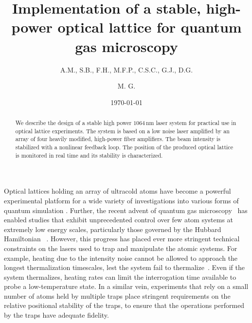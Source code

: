 \documentclass[twocolumn,aps,pra,showpacs,preprintnumbers,bibnotes]{revtex4-1}
\begin{document}
\title{Implementation of a stable, high-power optical lattice for quantum gas microscopy}


\author{A.M., S.B., F.H., M.F.P., C.S.C., G.J., D.G.}
\author{M. G.}

\date{\today}
\begin{abstract}
 We describe the design of a stable high power $1064\,$nm laser system for practical use in optical lattice experiments. The system is based on a low noise laser amplified by an array of four heavily modified, high-power fiber amplifiers. The beam intensity is stabilized with a nonlinear feedback loop. The position of the produced optical lattice is monitored in real time and its stability is characterized.
\end{abstract}
\maketitle

Optical lattices holding an array of ultracold atoms have become a powerful experimental platform for a wide variety of investigations into various forms of quantum simulation \cite{Friedenauer2008, Kim2010, Struck2011, Simon2011, Yan2013, Drewes2016, Murmann2015}.%
Further, the recent advent of quantum gas microscopy~\cite{Bakr2009, Sherson2010, Haller2015, Cheuk2015, Parsons2015, Edge2015, Omran2015, Greif2016, Cheuk2016, Parsons2016, Boll2016, Cheuk2016a, Brown2016} has enabled studies that exhibit unprecedented control over few atom systems at extremely low energy scales, particularly those governed by the Hubbard Hamiltonian ~\cite{Hubbard1963}.
However, this progress has placed ever more stringent technical constraints on the lasers used to trap and manipulate the atomic systems.
For example, heating due to the intensity noise cannot be allowed to approach the longest thermalization timescales, lest the system fail to thermalize~\cite{Savard1997}.
Even if the system thermalizes, heating rates can limit the interrogation time available to probe a low-temperature state.
In a similar vein, experiments that rely on a small number of atoms held by multiple traps place stringent requirements on the relative positional stability of the traps, to ensure that the operations performed by the traps have adequate fidelity.%
\end{document}
